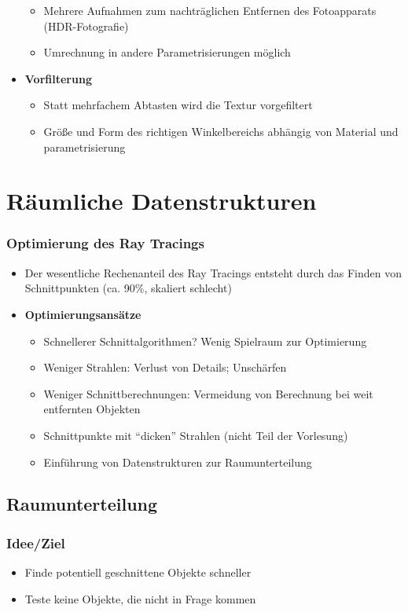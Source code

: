 \begin{itemize}
\begin{itemize}
		\item Mehrere Aufnahmen zum nachträglichen Entfernen des Fotoapparats (HDR-Fotografie)
		\item Umrechnung in andere Parametrisierungen möglich
	\end{itemize}
	\item \textbf{Vorfilterung}
	\begin{itemize}
		\item Statt mehrfachem Abtasten wird die Textur vorgefiltert
		\item Größe und Form des richtigen Winkelbereichs abhängig von Material und parametrisierung
	\end{itemize}
\end{itemize}



\section{Räumliche Datenstrukturen}

\subsubsection{Optimierung des Ray Tracings}
\begin{itemize}
	\item Der wesentliche Rechenanteil des Ray Tracings entsteht durch das Finden von Schnittpunkten (ca. 90\%, skaliert schlecht)
	\item \textbf{Optimierungsansätze}
	\begin{itemize}
		\item Schnellerer Schnittalgorithmen? Wenig Spielraum zur Optimierung
		\item Weniger Strahlen: Verlust von Details; Unschärfen
		\item Weniger Schnittberechnungen: Vermeidung von Berechnung bei weit entfernten Objekten
		\item Schnittpunkte mit "`dicken"' Strahlen (nicht Teil der Vorlesung)
		\item Einführung von Datenstrukturen zur Raumunterteilung
	\end{itemize}
\end{itemize}


\subsection{Raumunterteilung}

\subsubsection{Idee/Ziel}
\begin{itemize}
	\item Finde potentiell geschnittene Objekte schneller
	\item Teste keine Objekte, die nicht in Frage kommen
\end{itemize}



